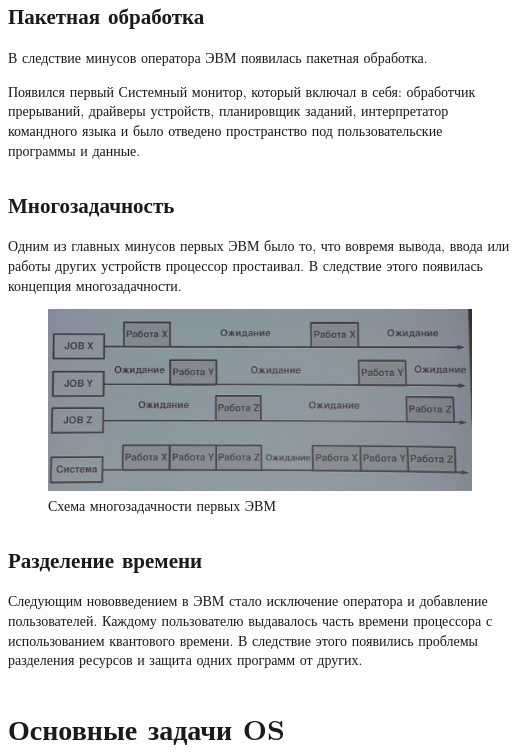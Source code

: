 \documentclass[bachelor, och, pract]{SCWorks}
\theoremstyle{remark}
\begin{document}
    \subsection{Пакетная обработка}
    В следствие минусов оператора ЭВМ появилась пакетная обработка.

    Появился первый Системный монитор, который включал в себя: обработчик прерываний, драйверы устройств, планировщик заданий, интерпретатор командного языка и было отведено пространство под пользовательские программы и данные.


    \subsection{Многозадачность}

    Одним из главных минусов первых ЭВМ было то, что вовремя вывода, ввода или работы других устройств процессор простаивал. В следствие этого появилась концепция многозадачности.

    \begin{figure}[H]
        \begin{center}
            \includegraphics[scale=0.4]{res/multitasking.png}
            \caption{Схема многозадачности первых ЭВМ}
        \end{center}
    \end{figure}
    
    \subsection{Разделение времени}
    
    Следующим нововведением в ЭВМ стало исключение оператора и добавление пользователей. Каждому пользователю выдавалось часть времени процессора с использованием квантового времени. В следствие этого появились проблемы разделения ресурсов и защита одних программ от других.

    \section{Основные задачи OS}
\end{document}
